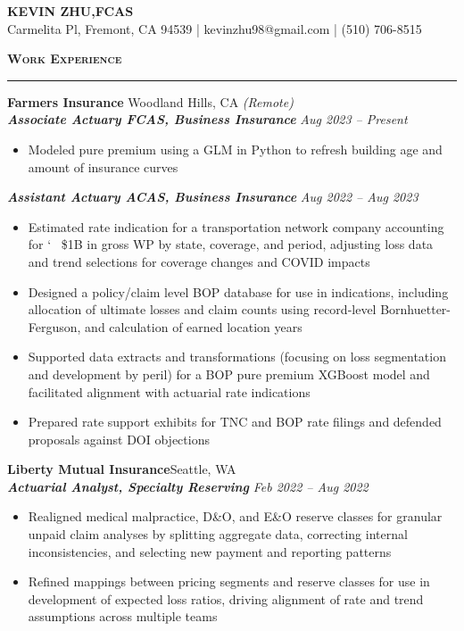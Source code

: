 \documentclass[11pt,letterpaper]{article}
\newcommand{\sectline}{\vspace{5pt}\hrule height 1.5pt\vspace{5pt}}
\newcommand{\sectspace}{\vspace{9pt}}
\newcommand{\smallspace}{\vspace{6pt}}
\newcommand{\heading}[1]{{\fontsize{12pt}{13pt} {\textbf{\textsc{#1}}}}}
\begin{document}
\centering
{\fontsize{13pt}{13pt}\selectfont \textbf{KEVIN ZHU,\hspace{1.7 mm}FCAS}} \vspace{2pt} \\

{\fontsize{11pt}{13pt} Carmelita Pl, Fremont, CA 94539 | kevinzhu98@gmail.com | (510) 706-8515}
\sectspace

\fontsize{11pt}{13.75pt}\selectfont
\raggedright

\heading{Work Experience}\sectline
\textbf{Farmers Insurance} \hfill Woodland Hills, CA \textit{(Remote)}\\
\textbf{\textit{Associate Actuary FCAS, Business Insurance}} \hfill \textit{Aug 2023 -- Present}
\begin{itemize}
	\item Modeled pure premium using a GLM in Python to refresh building age and amount of insurance curves  
\end{itemize}
\textbf{\textit{Assistant Actuary ACAS, Business Insurance}} \hfill \textit{Aug 2022 -- Aug 2023}
\begin{itemize}
	\item Estimated rate indication for a transportation network company accounting for \char`~ \$1B in gross WP by state, coverage, and period, adjusting loss data and trend selections for coverage changes and COVID impacts
	\item Designed a policy/claim level BOP database for use in indications, including allocation of ultimate losses and claim counts using record-level Bornhuetter-Ferguson, and calculation of earned location years
	\item Supported data extracts and transformations (focusing on loss segmentation and development by peril) for a BOP pure premium XGBoost model and facilitated alignment with actuarial rate indications
	\item Prepared rate support exhibits for TNC and BOP rate filings and defended proposals against DOI objections
\end{itemize}
\smallspace
\textbf{Liberty Mutual Insurance}\hfill Seattle, WA \\
\textbf{\textit{Actuarial Analyst, Specialty Reserving}} \hfill \textit{Feb 2022 -- Aug 2022} \\
\begin{itemize}
	\item Realigned medical malpractice, D\&O, and E\&O reserve classes for granular unpaid claim analyses by splitting aggregate data, correcting internal inconsistencies, and selecting new payment and reporting patterns
	\item Refined mappings between pricing segments and reserve classes for use in development of expected loss ratios, driving alignment of rate and trend assumptions across multiple teams
\end{itemize}
\end{document}
